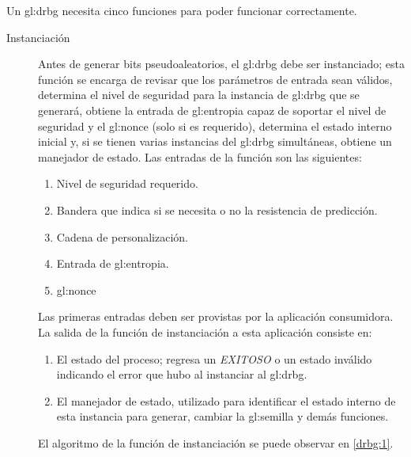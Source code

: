 %
%

Un \gls{gl:drbg} necesita cinco funciones para poder funcionar correctamente.
\begin{description}
  \item [Instanciación] Antes de generar bits pseudoaleatorios, el \gls{gl:drbg}
    debe ser instanciado; esta función se encarga de revisar que los parámetros
    de entrada sean válidos, determina  el nivel de seguridad para la instancia
    de \gls{gl:drbg} que se generará, obtiene la entrada de \gls{gl:entropia}
    capaz de soportar el nivel de seguridad y el \gls{gl:nonce} (solo si es
    requerido), determina el estado interno inicial y, si se tienen varias
    instancias del \gls{gl:drbg} simultáneas, obtiene un manejador de estado.
    Las entradas de la función son las siguientes:
    \begin{enumerate}
      \item Nivel de seguridad requerido.
      \item Bandera que indica si se necesita o no la resistencia de predicción.
      \item Cadena de personalización.
      \item Entrada de \gls{gl:entropia}. 
      \item \gls{gl:nonce}
    \end{enumerate}
    Las primeras entradas deben ser provistas por la aplicación consumidora. La
    salida de la función de instanciación a esta aplicación consiste en:
    \begin{enumerate}
      \item El estado del proceso; regresa un \textit{EXITOSO} o un estado
        inválido indicando el error que hubo al instanciar al \gls{gl:drbg}.
      \item El manejador de estado, utilizado para identificar el estado interno
        de esta instancia para generar, cambiar la \gls{gl:semilla} y demás
        funciones.
    \end{enumerate}
    El algoritmo de la función de instanciación se puede observar en 
    \ref{drbg:1}.


\end{description}
